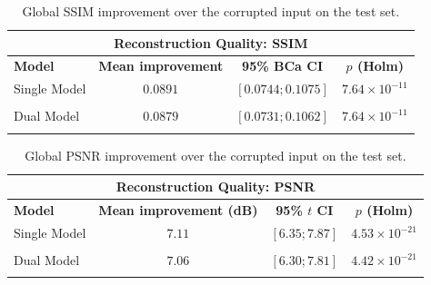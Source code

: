 \begin{table}[htbp]
\centering
\small
\begin{tabular}{lccc}
\multicolumn{4}{c}{\textbf{Reconstruction Quality: SSIM}} \\[3pt]
\toprule
\textbf{Model} & \textbf{Mean improvement} & \textbf{95\% BCa CI} & \textbf{$p$ (Holm)} \\
\midrule
Single Model & $0.0891$ & $[0.0744; 0.1075]$ & $7.64\times10^{-11}$ \\\\
Dual Model & $0.0879$ & $[0.0731; 0.1062]$ & $7.64\times10^{-11}$ \\\\
\bottomrule
\end{tabular}
\captionsetup{skip=2pt}
\caption[SSIM improvement over corrupted input]{Global SSIM improvement over the corrupted input on the test set.}
\label{tab:ablation_improvement_ssim}
\end{table}
\begin{table}[htbp]
\centering
\small
\begin{tabular}{lccc}
\multicolumn{4}{c}{\textbf{Reconstruction Quality: PSNR}} \\[3pt]
\toprule
\textbf{Model} & \textbf{Mean improvement (dB)} & \textbf{95\% $t$ CI} & \textbf{$p$ (Holm)} \\
\midrule
Single Model & $7.11$ & $[6.35; 7.87]$ & $4.53\times10^{-21}$ \\\\
Dual Model & $7.06$ & $[6.30; 7.81]$ & $4.42\times10^{-21}$ \\\\
\bottomrule
\end{tabular}
\captionsetup{skip=2pt}
\caption[PSNR improvement over corrupted input]{Global PSNR improvement over the corrupted input on the test set.}
\label{tab:ablation_improvement_psnr}
\end{table}
